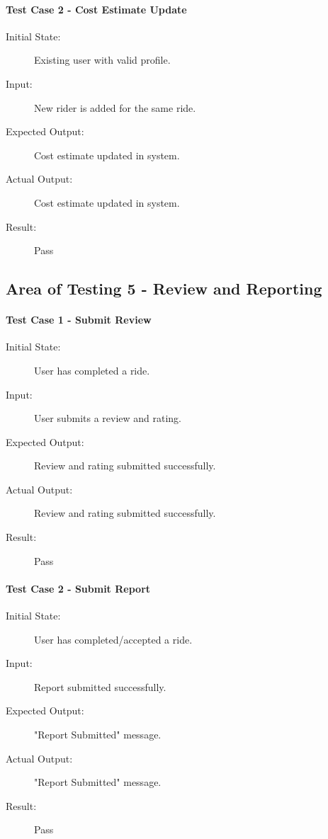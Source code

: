 \paragraph{Test Case 2 - Cost Estimate Update} \label{test-FR4-2}
\begin{description}
    \item[Initial State:] Existing user with valid profile.
    \item[Input:] New rider is added for the same ride.
    \item[Expected Output:] Cost estimate updated in system.
    \item[Actual Output:] Cost estimate updated in system.
    \item[Result:] Pass
\end{description}

\subsection{Area of Testing 5 - Review and Reporting}
\paragraph{Test Case 1 - Submit Review} \label{test-FR5-1}
\begin{description}
    \item[Initial State:] User has completed a ride. 
    \item[Input:] User submits a review and rating.
    \item[Expected Output:] Review and rating submitted successfully.
    \item[Actual Output:] Review and rating submitted successfully. 
    \item[Result:] Pass
\end{description}
\paragraph{Test Case 2 - Submit Report} \label{test-FR5-2}
\begin{description}
    \item[Initial State:] User has completed/accepted a ride.
    \item[Input:] Report submitted successfully.
    \item[Expected Output:] "Report Submitted" message.
    \item[Actual Output:] "Report Submitted" message.
    \item[Result:] Pass
\end{description}
